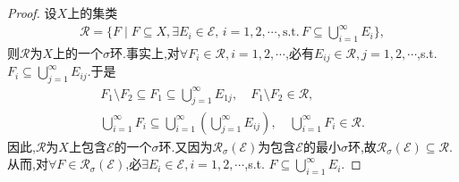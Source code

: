 \documentclass[../../main.tex]{subfiles}%
\begin{document}
\begin{proof}

设$X$上的集类
\begin{align*}
\mathscr{R} = \{F \mid F \subseteq X, \exists E_i \in \mathscr{E}, \, i=1,2,\cdots,\text{s.t.} \, F \subseteq \bigcup_{i=1}^{\infty} E_i\},
\end{align*}
则$\mathscr{R}$为$X$上的一个$\sigma$环.事实上,对$\forall F_i \in \mathscr{R},i=1,2,\cdots$,必有$E_{ij} \in \mathscr{R},j=1,2,\cdots$,s.t. $F_i \subseteq \bigcup_{j=1}^{\infty} E_{ij}$.于是
\begin{align*}
F_1 \setminus F_2 \subseteq F_1 \subseteq \bigcup_{j=1}^{\infty} E_{1j}, \quad F_1 \setminus F_2 \in \mathscr{R}, \\
\bigcup_{i=1}^{\infty} F_i \subseteq \bigcup_{i=1}^{\infty} \left( \bigcup_{j=1}^{\infty} E_{ij} \right), \quad \bigcup_{i=1}^{\infty} F_i \in \mathscr{R}.
\end{align*}
因此,$\mathscr{R}$为$X$上包含$\mathscr{E}$的一个$\sigma$环.又因为$\mathscr{R}_\sigma(\mathscr{E})$为包含$\mathscr{E}$的最小$\sigma$环,故$\mathscr{R}_\sigma(\mathscr{E}) \subseteq \mathscr{R}$.从而,对$\forall F \in \mathscr{R}_\sigma(\mathscr{E})$,必$\exists E_i \in \mathscr{E},i=1,2,\cdots$,s.t. $F \subseteq \bigcup_{i=1}^{\infty} E_i$.

\end{proof}
\end{document}
